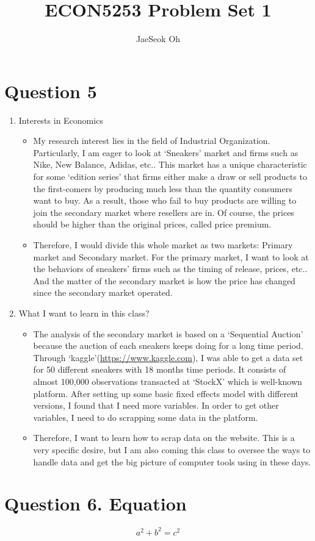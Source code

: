 \documentclass{article}
\title{ECON5253 Problem Set 1}
\author{JaeSeok Oh}
\begin{document}
\maketitle


\section*{Question 5}

\begin{enumerate}
    \item Interests in Economics
    \begin{itemize}
        \item My research interest lies in the field of Industrial Organization. Particularly, I am eager to look at `Sneakers' market and firms such as Nike, New Balance, Adidas, etc.. This market has a unique characteristic for some `edition series' that firms either make a draw or sell products to the first-comers by producing much less than the quantity consumers want to buy. As a result, those who fail to buy products are willing to join the secondary market where resellers are in. Of course, the prices should be higher than the original prices, called price premium.
        \item Therefore, I would divide this whole market as two markets: Primary market and Secondary market. For the primary market, I want to look at the behaviors of sneakers' firms such as the timing of release, prices, etc.. And the matter of the secondary market is how the price has changed since the secondary market operated. 
    \end{itemize}
    \item What I want to learn in this class?
    \begin{itemize}
        \item The analysis of the secondary market is based on a `Sequential Auction' because the auction of each sneakers keeps doing for a long time period. Through `kaggle'(\url{https://www.kaggle.com}), I was able to get a data set for 50 different sneakers with 18 months time periods. It consists of almost 100,000 observations transacted at `StockX' which is well-known platform. After setting up some basic fixed effects model with different versions, I found that I need more variables. In order to get other variables, I need to do scrapping some data in the platform.
        \item Therefore, I want to learn how to scrap data on the website. This is a very specific desire, but I am also coming this class to oversee the ways to handle data and get the big picture of computer tools using in these days.
    \end{itemize}
\end{enumerate}

\section*{Question 6. Equation}
\begin{equation}
    a^{2} + b^{2} = c^{2}
\end{equation}





\end{document}
